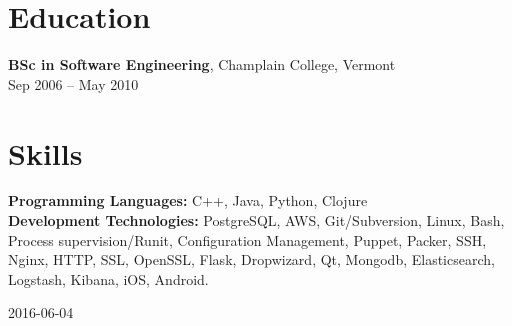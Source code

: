 \documentclass{article}
\newenvironment{bottompar}{\par\vspace*{\fill}}{\clearpage}
\begin{document}
\section*{Education}
{\bf BSc in Software Engineering}, Champlain College, Vermont\\
Sep 2006 -- May 2010\\

\section*{Skills}
{\bf Programming Languages:} C++, Java, Python, Clojure\\
{\bf Development Technologies:} PostgreSQL, AWS, Git/Subversion, Linux, Bash, Process supervision/Runit, Configuration Management, Puppet, Packer, SSH, Nginx, HTTP, SSL, OpenSSL, Flask, Dropwizard, Qt, Mongodb, Elasticsearch, Logstash, Kibana, iOS, Android.\\

\begin{bottompar}
\begin{center}
{\small 2016-06-04}
\end{center}
\end{bottompar}
\end{document}
